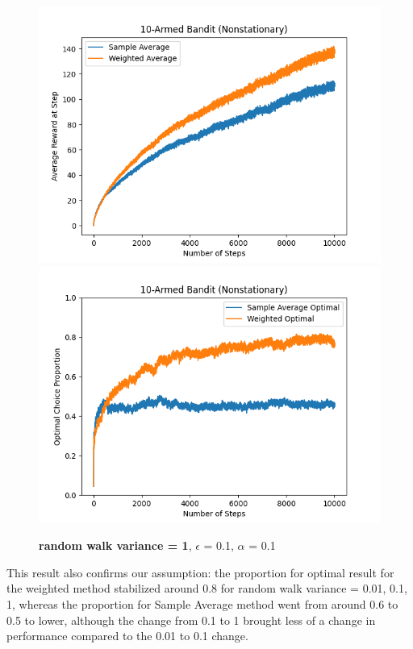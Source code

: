 \documentclass{article}
\begin{document}
\begin{figure}[h!]
\centering
\includegraphics[scale=.6]{RL_A1_pics/rand_walk_var/1.png}
\includegraphics[scale=.6]{RL_A1_pics/rand_walk_var/optimal/1.png}
\caption{\textbf{random walk variance = 1}, $\epsilon$ = 0.1, $\alpha$ = 0.1}
\label{fig:10-Armed1}
\end{figure}

\newpage
This result also confirms our assumption: the proportion for optimal result for the weighted method stabilized around 0.8 for random walk variance = 0.01, 0.1, 1, whereas the proportion for Sample Average method went from around 0.6 to 0.5 to lower, although the change from 0.1 to 1 brought less of a change in performance compared to the 0.01 to 0.1 change.
\end{document}
